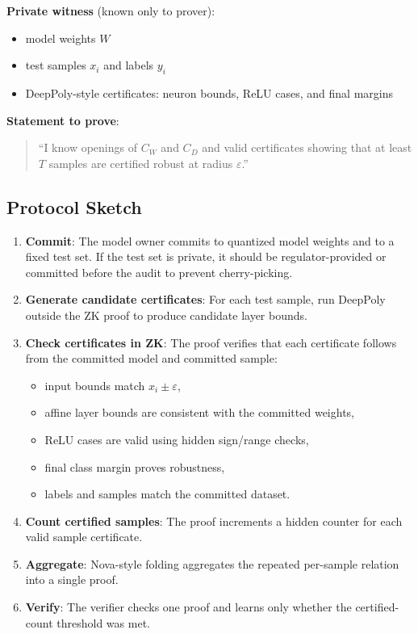 \documentclass[11pt,a4paper]{article}
\begin{document}
\textbf{Private witness} (known only to prover):
\begin{itemize}
    \item model weights $W$
    \item test samples $x_i$ and labels $y_i$
    \item DeepPoly-style certificates: neuron bounds, ReLU cases, and final margins
\end{itemize}

\textbf{Statement to prove}:
\begin{quote}
``I know openings of $C_W$ and $C_D$ and valid certificates showing that at least $T$ samples are certified robust at radius $\varepsilon$.''
\end{quote}

\subsection{Protocol Sketch}

\begin{enumerate}
    \item \textbf{Commit}: The model owner commits to quantized model weights and to a fixed test set. If the test set is private, it should be regulator-provided or committed before the audit to prevent cherry-picking.

    \item \textbf{Generate candidate certificates}: For each test sample, run DeepPoly outside the ZK proof to produce candidate layer bounds.

    \item \textbf{Check certificates in ZK}: The proof verifies that each certificate follows from the committed model and committed sample:
    \begin{itemize}
        \item input bounds match $x_i \pm \varepsilon$,
        \item affine layer bounds are consistent with the committed weights,
        \item ReLU cases are valid using hidden sign/range checks,
        \item final class margin proves robustness,
        \item labels and samples match the committed dataset.
    \end{itemize}

    \item \textbf{Count certified samples}: The proof increments a hidden counter for each valid sample certificate.

    \item \textbf{Aggregate}: Nova-style folding aggregates the repeated per-sample relation into a single proof.

    \item \textbf{Verify}: The verifier checks one proof and learns only whether the certified-count threshold was met.
\end{enumerate}
\end{document}
